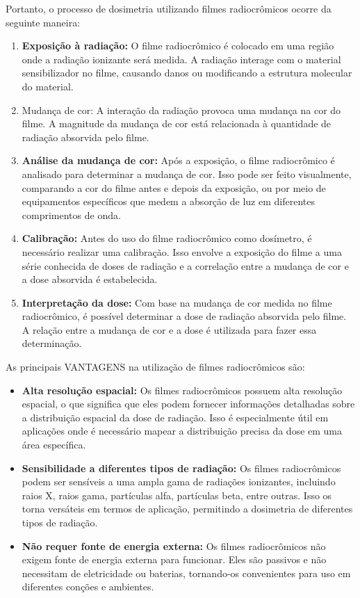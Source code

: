 \documentclass[11pt,a4paper]{article}
\begin{document}
		Portanto, o processo de dosimetria utilizando filmes radiocrômicos ocorre da seguinte maneira:
		\begin{enumerate}
			\item \textbf{Exposição à radiação:} O filme radiocrômico é colocado em uma região onde a radiação ionizante será medida. A radiação interage com o material sensibilizador no filme, causando danos ou modificando a estrutura molecular do material.
			\item Mudança de cor: A interação da radiação provoca uma mudança na cor do filme. A magnitude da mudança de cor está relacionada à quantidade de radiação absorvida pelo filme.
			\item \textbf{Análise da mudança de cor:} Após a exposição, o filme radiocrômico é analisado para determinar a mudança de cor. Isso pode ser feito visualmente, comparando a cor do filme antes e depois da exposição, ou por meio de equipamentos específicos que medem a absorção de luz em diferentes comprimentos de onda.
			\item \textbf{Calibração:} Antes do uso do filme radiocrômico como dosímetro, é necessário realizar uma calibração. Isso envolve a exposição do filme a uma série conhecida de doses de radiação e a correlação entre a mudança de cor e a dose absorvida é estabelecida.
			\item \textbf{Interpretação da dose:} Com base na mudança de cor medida no filme radiocrômico, é possível determinar a dose de radiação absorvida pelo filme. A relação entre a mudança de cor e a dose é utilizada para fazer essa determinação.
		\end{enumerate}

		
		As principais \textcolor{CarnationPink}{VANTAGENS} na utilização de filmes radiocrômicos são:

		\begin{itemize}[label=\textcolor{CarnationPink}{$\blacktriangleright$}]
			\item \textbf{Alta resolução espacial:} Os filmes radiocrômicos possuem alta resolução espacial, o que significa que eles podem fornecer informações detalhadas sobre a distribuição espacial da dose de radiação. Isso é especialmente útil em aplicações onde é necessário mapear a distribuição precisa da dose em uma área específica.
			\item \textbf{Sensibilidade a diferentes tipos de radiação:} Os filmes radiocrômicos podem ser sensíveis a uma ampla gama de radiações ionizantes, incluindo raios X, raios gama, partículas alfa, partículas beta, entre outras. Isso os torna versáteis em termos de aplicação, permitindo a dosimetria de diferentes tipos de radiação.
			\item \textbf{Não requer fonte de energia externa:} Os filmes radiocrômicos não exigem fonte de energia externa para funcionar. Eles são passivos e não necessitam de eletricidade ou baterias, tornando-os convenientes para uso em diferentes conções e ambientes.
		\end{itemize}
\end{document}
